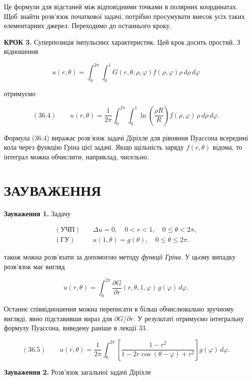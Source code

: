\documentclass[
  ukrainian,
]{article}
\begin{document}
Це формули для відстаней між відповідними точками в полярних
координатах. Щоб знайти розв'язок початкової задачі, потрібно
просумувати внесок усіх таких елементарних джерел. Переходимо до
останнього кроку.

\textbf{КРОК 3.} Суперпозиція імпульсних характеристик. Цей крок досить
простий. З відношення

\[u(r, \theta) = \int_{0}^{2\pi} \int_{0}^{1} G(r, \theta, \rho, \varphi) f(\rho, \varphi) \rho\, d\rho\, d\varphi\]

отримуємо

\[(36.4)\qquad u(r, \theta) = \frac{1}{2\pi} \int_{0}^{2\pi} \int_{0}^{1}\ln \left(\frac{\rho \overline{R}}{R}\right) f(\rho, \varphi)\,\rho\, d\rho\, d\varphi.\]

Формула (36.4) виражає розв'язок задачі Діріхле для рівняння Пуассона
всередині кола через функцію Гріна цієї задачі. Якщо щільність заряду
\(f(r, \theta)\) відома, то інтеграл можна обчислити, наприклад,
чисельно.

\section{ЗАУВАЖЕННЯ}\label{ux437ux430ux443ux432ux430ux436ux435ux43dux43dux44f-11}

\textbf{Зауваження 1.} Задачу

\[\begin{aligned}(\text{УЧП}) \quad & \Delta u = 0, \quad 0 < r < 1, \quad 0 \leqslant \theta < 2\pi, \\(\text{ГУ}) \quad & u(1, \theta) = g(\theta), \quad 0 \leqslant \theta \leqslant 2\pi.\end{aligned}\]

також можна розв'язати за допомогою методу \emph{функції Гріна}. У цьому
випадку розв'язок має вигляд

\[u(r, \theta) = \int_{0}^{2\pi} \frac{\partial G}{\partial r}(r, \theta, 1, \varphi)\, g(\varphi)\, d\varphi.\]

Останнє співвідношення можна переписати в більш обчислювально зручному
вигляді, явно підставивши вираз для \(\partial G/\partial r\). У
результаті отримуємо інтегральну формулу Пуассона, виведену раніше в
лекції 33.

\[(36.5)\qquad u(r, \theta) = \frac{1}{2\pi} \int_{0}^{2\pi}\left[ \frac{1 - r^2}{1 - 2r\cos(\theta - \varphi) + r^2} \right] g(\varphi)\, d\varphi.\]

\textbf{Зауваження 2.} Розв'язок загальної задачі Діріхле
\end{document}
